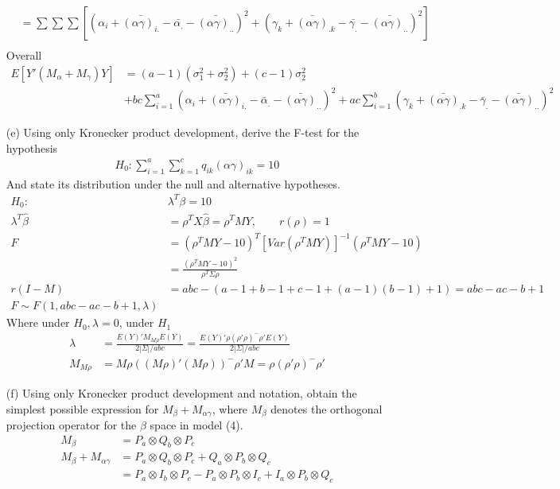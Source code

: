 \documentclass{homework}
\begin{document}
\begin{itemize}
\begin{align*}
&= \sum\sum\sum [(\alpha_i + \bar{(\alpha\gamma)_{i.}} - \bar{\alpha_{.}} - \bar{(\alpha\gamma)_{..}})^2 + (\gamma_k + \bar{(\alpha\gamma)}_{.k} - \bar{\gamma_{.}} - \bar{(\alpha\gamma)_{..}})^2]\\
\end{align*} 
Overall
\begin{align*}
E[Y'(M_{\alpha} + M_{\gamma})Y] &= (a-1)(\sigma_1^2 + \sigma_2^2) + (c-1) \sigma_2^2\\ 
&+ bc \sum_{i=1}^a (\alpha_i + \bar{(\alpha\gamma)}_{i.} - \bar{\alpha}_{.} - \bar{(\alpha\gamma)}_{..})^2 + ac \sum_{i=1}^b (\gamma_k + \bar{(\alpha\gamma)}_{.k} - \bar{\gamma}_{.} - \bar{(\alpha\gamma)}_{..})^2
\end{align*}
\item[(e)]Using only Kronecker product development, derive the F-test for the hypothesis\\
\begin{align*}
H_0: \sum_{i=1}^a \sum_{k=1}^c q_{ik} (\alpha\gamma)_{ik} = 10
\end{align*}
And state its distribution under the null and alternative hypotheses.\\
\begin{align*}
H_0: & \lambda^T \beta = 10\\
 \lambda^T \hat{\beta} &= \rho^T X \hat{\beta} = \rho^T M Y , \qquad r(\rho) = 1\\
 F &= (\rho^T M Y - 10)^T [Var(\rho^T MY)]^{-1} (\rho^T M Y - 10)\\
 &= \frac{(\rho^T M Y - 10)^2}{\rho^T \Sigma \rho}\\
 r(I-M) &= abc - (a-1 + b-1 + c-1 + (a-1)(b-1) + 1) = abc -ac -b + 1\\
 F \sim F(1, abc -ac -b + 1, \lambda)
\end{align*}
Where under $H_0, \lambda = 0$, under $H_1 $
\begin{align*}
 \lambda &= \frac{E(Y)'M_{M\rho}E(Y)}{2|\Sigma|/abc} = \frac{E(Y)'\rho (\rho'\rho)^{-} \rho' E(Y)}{2|\Sigma|/abc}\\
 M_{M\rho} &= M\rho \left( (M\rho)' (M\rho) \right)^{-} \rho'M = \rho (\rho'\rho)^{-} \rho'
\end{align*}

\item[(f)] Using only Kronecker product development and notation, obtain the simplest possible
expression for $M_{\beta} +M_{\alpha\gamma}$, where $M_{\beta}$ denotes the orthogonal projection operator for the $\beta$ space in model (4).\\
\begin{align*}
M_{\beta} &= P_a \otimes Q_b \otimes P_c\\
M_{\beta} + M_{\alpha\gamma} &= P_a \otimes Q_b \otimes P_c +Q_a \otimes P_b \otimes Q_c\\
&= P_a \otimes I_b \otimes P_c - P_a \otimes P_b \otimes I_c + I_a \otimes P_b \otimes Q_c
\end{align*}


\end{itemize}
\end{document}
